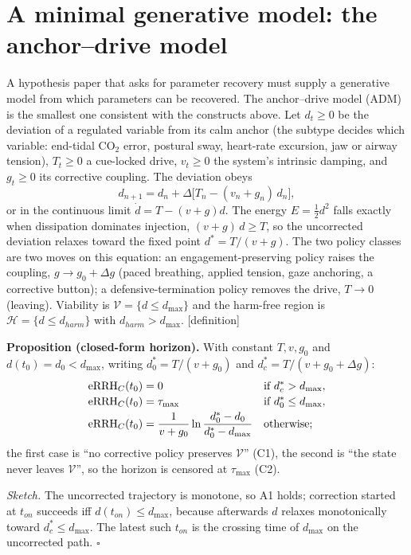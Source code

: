 \documentclass[9pt,twocolumn]{article}
\newcommand{\eRRHc}{\mathrm{eRRH}_{C}}
\newcommand{\tier}[1]{{\sffamily\scriptsize\color{RRHMSlate}[#1]}}
\newcommand{\Vset}{\mathcal{V}}
\newcommand{\Hset}{\mathcal{H}}
\begin{document}
\section{A minimal generative model: the anchor--drive model}
\label{sec:adm}
A hypothesis paper that asks for parameter recovery must supply a generative model from which parameters can be recovered. The anchor--drive model (ADM) is the smallest one consistent with the constructs above. Let $d_t\ge0$ be the deviation of a regulated variable from its calm anchor (the subtype decides which variable: end-tidal CO$_2$ error, postural sway, heart-rate excursion, jaw or airway tension), $T_t\ge0$ a cue-locked drive, $v_t\ge0$ the system's intrinsic damping, and $g_t\ge0$ its corrective coupling. The deviation obeys
\begin{equation}
d_{n+1}=d_n+\Delta\big[T_n-(v_n+g_n)\,d_n\big],
\label{eq:adm}
\end{equation}
or in the continuous limit $\dot d=T-(v+g)d$. The energy $E=\tfrac12 d^2$ falls exactly when dissipation dominates injection, $(v+g)\,d\ge T$, so the uncorrected deviation relaxes toward the fixed point $d^{*}=T/(v+g)$. The two policy classes are two moves on this equation: an engagement-preserving policy raises the coupling, $g\to g_0+\Delta g$ (paced breathing, applied tension, gaze anchoring, a corrective button); a defensive-termination policy removes the drive, $T\to0$ (leaving). Viability is $\Vset=\{d\le d_{\max}\}$ and the harm-free region is $\Hset=\{d\le d_{harm}\}$ with $d_{harm}>d_{\max}$. \tier{definition}

\noindent\textbf{Proposition (closed-form horizon).} With constant $T,v,g_0$ and $d(t_0)=d_0<d_{\max}$, writing $d^{*}_0=T/(v+g_0)$ and $d^{*}_{c}=T/(v+g_0+\Delta g)$:
\begin{align}
\eRRHc(t_0)&=0 &&\text{if } d^{*}_{c}>d_{\max},\notag\\[-0.1em]
\eRRHc(t_0)&=\tau_{\max} &&\text{if } d^{*}_{0}\le d_{\max},\notag\\[-0.1em]
\eRRHc(t_0)&=\frac{1}{v+g_0}\ln\frac{d^{*}_0-d_0}{d^{*}_0-d_{\max}} &&\text{otherwise;}
\label{eq:closedform}
\end{align}
the first case is ``no corrective policy preserves $\Vset$'' (C1), the second is ``the state never leaves $\Vset$'', so the horizon is censored at $\tau_{\max}$ (C2).

\emph{Sketch.} The uncorrected trajectory is monotone, so A1 holds; correction started at $t_{on}$ succeeds iff $d(t_{on})\le d_{\max}$, because afterwards $d$ relaxes monotonically toward $d^{*}_c\le d_{\max}$. The latest such $t_{on}$ is the crossing time of $d_{\max}$ on the uncorrected path. $\square$
\end{document}
